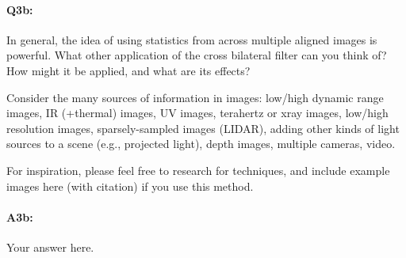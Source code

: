 \documentclass[11pt]{article}
\begin{document}
\paragraph{Q3b:}
In general, the idea of using statistics from across multiple aligned images is powerful. What other application of the cross bilateral filter can you think of? How might it be applied, and what are its effects? 

Consider the many sources of information in images: low/high dynamic range images, IR (+thermal) images, UV images, terahertz or xray images, low/high resolution images, sparsely-sampled images (LIDAR), adding other kinds of light sources to a scene (e.g., projected light), depth images, multiple cameras, video.

For inspiration, please feel free to research for techniques, and include example images here (with citation) if you use this method.


\paragraph{A3b:} Your answer here.










\end{document}

